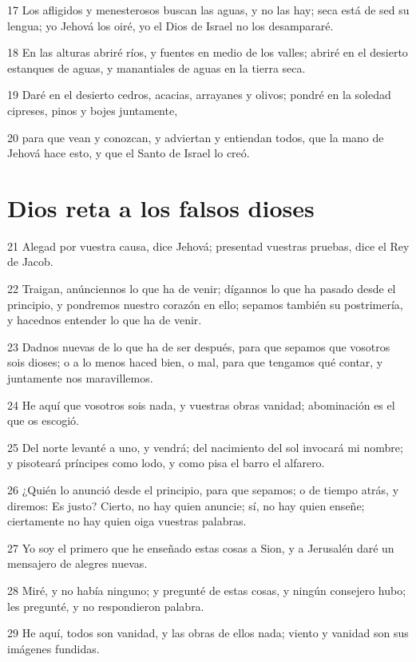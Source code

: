 \par 17 Los afligidos y menesterosos buscan las aguas, y no las hay; seca está de sed su lengua; yo Jehová los oiré, yo el Dios de Israel no los desampararé.
\par 18 En las alturas abriré ríos, y fuentes en medio de los valles; abriré en el desierto estanques de aguas, y manantiales de aguas en la tierra seca.
\par 19 Daré en el desierto cedros, acacias, arrayanes y olivos; pondré en la soledad cipreses, pinos y bojes juntamente,
\par 20 para que vean y conozcan, y adviertan y entiendan todos, que la mano de Jehová hace esto, y que el Santo de Israel lo creó.

\section*{Dios reta a los falsos dioses}

\par 21 Alegad por vuestra causa, dice Jehová; presentad vuestras pruebas, dice el Rey de Jacob.
\par 22 Traigan, anúnciennos lo que ha de venir; dígannos lo que ha pasado desde el principio, y pondremos nuestro corazón en ello; sepamos también su postrimería, y hacednos entender lo que ha de venir.
\par 23 Dadnos nuevas de lo que ha de ser después, para que sepamos que vosotros sois dioses; o a lo menos haced bien, o mal, para que tengamos qué contar, y juntamente nos maravillemos.
\par 24 He aquí que vosotros sois nada, y vuestras obras vanidad; abominación es el que os escogió.
\par 25 Del norte levanté a uno, y vendrá; del nacimiento del sol invocará mi nombre; y pisoteará príncipes como lodo, y como pisa el barro el alfarero.
\par 26 ¿Quién lo anunció desde el principio, para que sepamos; o de tiempo atrás, y diremos: Es justo? Cierto, no hay quien anuncie; sí, no hay quien enseñe; ciertamente no hay quien oiga vuestras palabras.
\par 27 Yo soy el primero que he enseñado estas cosas a Sion, y a Jerusalén daré un mensajero de alegres nuevas.
\par 28 Miré, y no había ninguno; y pregunté de estas cosas, y ningún consejero hubo; les pregunté, y no respondieron palabra.
\par 29 He aquí, todos son vanidad, y las obras de ellos nada; viento y vanidad son sus imágenes fundidas.

